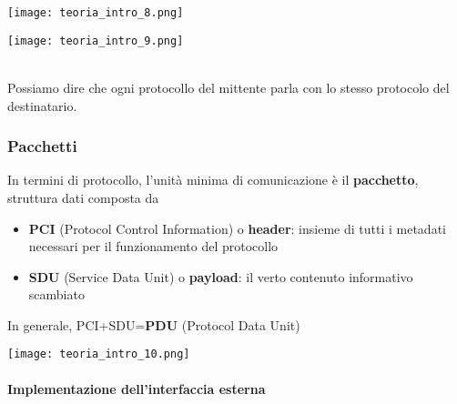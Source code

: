\noindent\begin{minipage}[c]{.5\textwidth}
\texttt{[image: teoria\_intro\_8.png]}
\end{minipage}
\begin{minipage}[c]{.5\textwidth}
\texttt{[image: teoria\_intro\_9.png]}
\end{minipage}\\

Possiamo dire che ogni protocollo del mittente parla con lo stesso protocolo del destinatario. 

\subsubsection{Pacchetti}

\noindent\begin{minipage}[c]{.7\textwidth}
In termini di protocollo, l'unit\`a minima di comunicazione \`e il \textbf{pacchetto}, struttura dati composta da
\begin{itemize}
  \item \textbf{PCI} (Protocol Control Information) o \textbf{header}: insieme di tutti i metadati necessari per il funzionamento del protocollo
  \item \textbf{SDU} (Service Data Unit) o \textbf{payload}: il verto contenuto informativo scambiato
\end{itemize}
In generale, PCI+SDU=\textbf{PDU} (Protocol Data Unit)
\end{minipage}\hfill
\begin{minipage}[c]{.25\textwidth}
\texttt{[image: teoria\_intro\_10.png]}
\end{minipage}

\paragraph{Implementazione dell'interfaccia esterna}~\\

